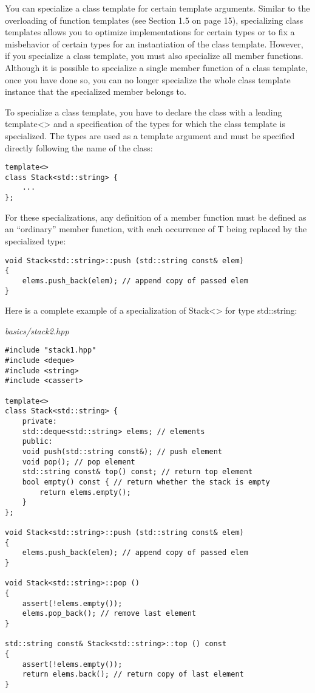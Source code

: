 You can specialize a class template for certain template arguments. Similar to the overloading of function templates (see Section 1.5 on page 15), specializing class templates allows you to optimize implementations for certain types or to fix a misbehavior of certain types for an instantiation of the class template. However, if you specialize a class template, you must also specialize all member functions. Although it is possible to specialize a single member function of a class template, once you have done so, you can no longer specialize the whole class template instance that the specialized member belongs to.

To specialize a class template, you have to declare the class with a leading template<> and a specification of the types for which the class template is specialized. The types are used as a template argument and must be specified directly following the name of the class:

\begin{lstlisting}[style=styleCXX]
template<>
class Stack<std::string> {
	...
};
\end{lstlisting}

For these specializations, any definition of a member function must be defined as an “ordinary” member function, with each occurrence of T being replaced by the specialized type:

\begin{lstlisting}[style=styleCXX]
void Stack<std::string>::push (std::string const& elem)
{
	elems.push_back(elem); // append copy of passed elem
}
\end{lstlisting}

Here is a complete example of a specialization of Stack<> for type std::string:

\noindent
\textit{basics/stack2.hpp}
\begin{lstlisting}[style=styleCXX]
#include "stack1.hpp"
#include <deque>
#include <string>
#include <cassert>

template<>
class Stack<std::string> {
	private:
	std::deque<std::string> elems; // elements
	public:
	void push(std::string const&); // push element
	void pop(); // pop element
	std::string const& top() const; // return top element
	bool empty() const { // return whether the stack is empty
		return elems.empty();
	}
};

void Stack<std::string>::push (std::string const& elem)
{
	elems.push_back(elem); // append copy of passed elem
}

void Stack<std::string>::pop ()
{
	assert(!elems.empty());
	elems.pop_back(); // remove last element
}

std::string const& Stack<std::string>::top () const
{
	assert(!elems.empty());
	return elems.back(); // return copy of last element
}
\end{lstlisting}

